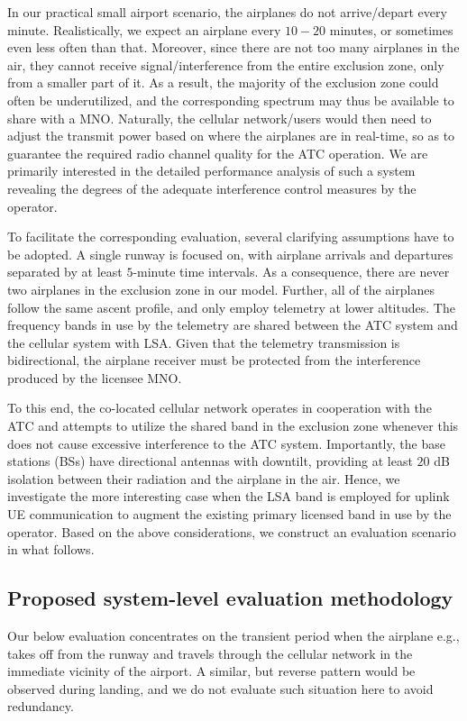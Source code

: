 \documentclass[journal]{IEEEtran}
\begin{document}
In our practical small airport scenario, the airplanes do not arrive/depart every minute. Realistically, we expect an airplane every $10-20$ minutes, or sometimes even less often than that. Moreover, since there are not too many airplanes in the air, they cannot receive signal/interference from the entire exclusion zone, only from a smaller part of it. As a result, the majority of the exclusion zone could often be underutilized, and the corresponding spectrum may thus be available to share with a MNO. Naturally, the cellular network/users would then need to adjust the transmit power based on where the airplanes are in real-time, so as to guarantee the required radio channel quality for the ATC operation. We are primarily interested in the detailed performance analysis of such a system revealing the degrees of the adequate interference control measures by the operator.

To facilitate the corresponding evaluation, several clarifying assumptions have to be adopted. A single runway is focused on, with airplane arrivals and departures separated by at least $5$-minute time intervals. As a consequence, there are never two airplanes in the exclusion zone in our model. Further, all of the airplanes follow the same ascent profile, and only employ telemetry at lower altitudes. The frequency bands in use by the telemetry are shared between the ATC system and the cellular system with LSA. Given that the telemetry transmission is bidirectional, the airplane receiver must be protected from the interference produced by the licensee MNO. 

To this end, the co-located cellular network operates in cooperation with the ATC and attempts to utilize the shared band in the exclusion zone whenever this does not cause excessive interference to the ATC system. Importantly, the base stations (BSs) have directional antennas with downtilt, providing at least $20$ dB isolation between their radiation and the airplane in the air. Hence, we investigate the more interesting case when the LSA band is employed for uplink UE communication to augment the existing primary licensed band in use by the operator. Based on the above considerations, we construct an evaluation scenario in what follows.

\subsection{Proposed system-level evaluation methodology}

Our below evaluation concentrates on the transient period when the airplane e.g., takes off from the runway and travels through the cellular network in the immediate vicinity of the airport. A similar, but reverse pattern would be observed during landing, and we do not evaluate such situation here to avoid redundancy.
\end{document}
